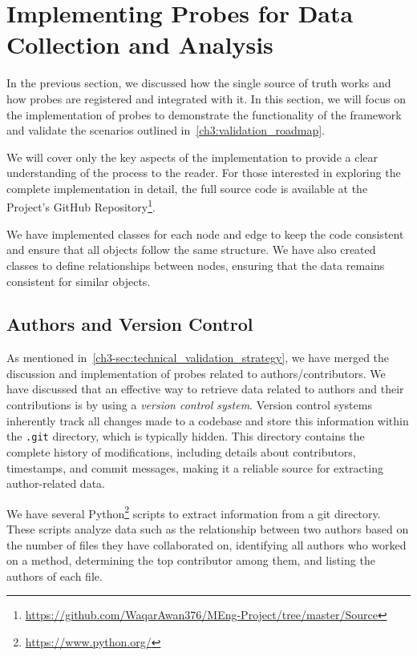 \section{Implementing Probes for Data Collection and Analysis}\label{sec:probes_implementation}

In the previous section, we discussed how the single source of truth works and how probes are registered and integrated with it. In this section, we will focus on the implementation of probes to demonstrate the functionality of the framework and validate the scenarios outlined in~\autoref{ch3:validation_roadmap}.  

We will cover only the key aspects of the implementation to provide a clear understanding of the process to the reader. For those interested in exploring the complete implementation in detail, the full source code is available at the Project's GitHub Repository\footnote{\url{https://github.com/WaqarAwan376/MEng-Project/tree/master/Source}}.

We have implemented classes for each node and edge to keep the code consistent and ensure that all objects follow the same structure. We have also created classes to define relationships between nodes, ensuring that the data remains consistent for similar objects.

\subsection{Authors and Version Control}

As mentioned in~\autoref{ch3-sec:technical_validation_strategy}, we have merged the discussion and implementation of probes related to authors/contributors. We have discussed that an effective way to retrieve data related to authors and their contributions is by using a \textit{version control system}. Version control systems inherently track all changes made to a codebase and store this information within the \texttt{.git} directory, which is typically hidden. This directory contains the complete history of modifications, including details about contributors, timestamps, and commit messages, making it a reliable source for extracting author-related data.

We have several Python\footnote{\url{https://www.python.org/}} scripts to extract information from a git directory. These scripts analyze data such as the relationship between two authors based on the number of files they have collaborated on, identifying all authors who worked on a method, determining the top contributor among them, and listing the authors of each file.

